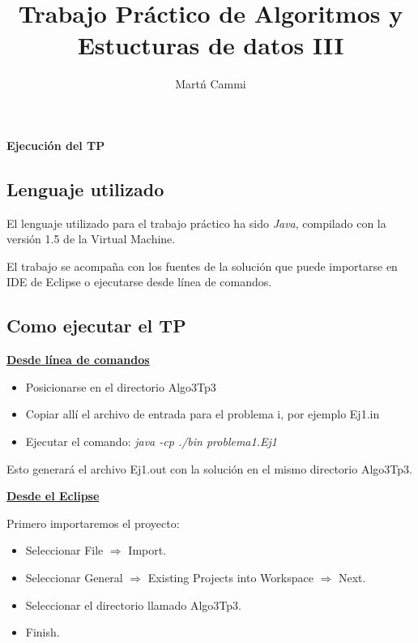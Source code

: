 \documentclass[11pt, a4paper, spanish]{article}
\author{Mart\'n Cammi}
\title{Trabajo Pr\'actico de Algoritmos y Estucturas de datos III}
\begin{document}

\maketitle

\thispagestyle{empty}

\tableofcontents

\newpage


\textbf{Ejecuci\'on del TP}
\label{sec:ejecucion}

	\subsection{Lenguaje utilizado}
		
		El lenguaje utilizado para el trabajo pr\'actico ha sido \emph{Java}, compilado con la versi\'on 1.5 de la Virtual Machine.
		
		El trabajo se acompa\~{n}a con los fuentes de la soluci\'on que puede importarse en IDE de Eclipse o ejecutarse desde l\'inea de comandos.

	\subsection{Como ejecutar el TP}
	
	\textbf{\underline{Desde l\'inea de comandos}}
	\begin{itemize}
			\item{Posicionarse en el directorio Algo3Tp3}
			\item{Copiar all\'i el archivo de entrada para el problema i, por ejemplo Ej1.in}
			\item{Ejecutar el comando: \emph{java -cp ./bin problema1.Ej1}}
	\end{itemize}
	Esto generar\'a el archivo Ej1.out con la soluci\'on en el mismo directorio Algo3Tp3.

	\textbf{\underline{Desde el Eclipse}}
	
	Primero importaremos el proyecto:	
	
	\begin{itemize}
			\item{Seleccionar File $\Rightarrow$ Import.}
			\item{Seleccionar General $\Rightarrow$ Existing Projects into Workspace $\Rightarrow$ Next.}
			\item{Seleccionar el directorio llamado Algo3Tp3.}
			\item{Finish.}
	\end{itemize}
	
\end{document}
